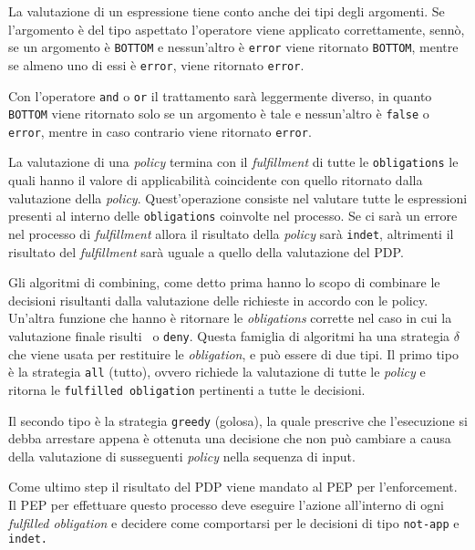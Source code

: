 La valutazione di un espressione tiene conto anche dei tipi degli argomenti. Se l'argomento è del tipo aspettato l'operatore viene applicato correttamente, sennò, se un argomento è \texttt{BOTTOM} e nessun'altro è \texttt{error} viene ritornato \texttt{BOTTOM}, mentre se almeno uno di essi è \texttt{error}, viene ritornato \texttt{error}.\\ \par
Con l'operatore \texttt{and} o \texttt{or} il trattamento sarà leggermente diverso, in quanto \texttt{BOTTOM} viene ritornato solo se un argomento è tale e nessun'altro è \texttt{false} o \texttt{error}, mentre in caso contrario viene ritornato \texttt{error}.\\ \par
La valutazione di una \textit{policy} termina con il \textit{fulfillment} di tutte le \texttt{obligations} le quali hanno il valore di applicabilità coincidente con quello ritornato dalla valutazione della \textit{policy}. Quest'operazione consiste nel valutare tutte le espressioni presenti al interno delle \texttt{obligations} coinvolte nel processo. Se ci sarà un errore nel processo di \textit{fulfillment} allora il risultato della \textit{policy} sarà \texttt{indet}, altrimenti il risultato del \textit{fulfillment} sarà uguale a quello della valutazione del PDP.\\ \par
Gli algoritmi di combining, come detto prima hanno lo scopo di combinare le decisioni risultanti dalla valutazione delle richieste in accordo con le policy. Un'altra funzione che hanno è ritornare le \textit{obligations} corrette nel caso in cui la valutazione finale risulti \permit \ o \texttt{deny}. Questa famiglia di algoritmi ha una strategia $\delta$ che viene usata per restituire le \textit{obligation}, e può essere di due tipi.
Il primo tipo è la strategia \texttt{all} (tutto), ovvero richiede la valutazione di tutte le \textit{policy} e ritorna le \texttt{fulfilled obligation} pertinenti a tutte le decisioni. \par
Il secondo tipo è la strategia \texttt{greedy} (golosa), la quale prescrive che l'esecuzione si debba arrestare appena è ottenuta una decisione che non può cambiare a causa della valutazione di susseguenti \textit{policy} nella sequenza di input.\\ \par
Come ultimo step il risultato del PDP viene mandato al PEP per l'enforcement.
Il PEP per effettuare questo processo deve eseguire l'azione all'interno di ogni \textit{fulfilled obligation} e decidere come comportarsi per le decisioni di tipo \texttt{not-app} e \texttt{indet.}\\ \par
